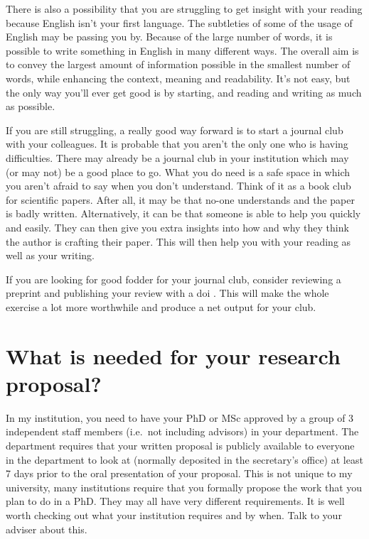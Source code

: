 \documentclass[
]{krantz}
\begin{document}
There is also a possibility that you are struggling to get insight with your reading because English isn't your first language. The subtleties of some of the usage of English may be passing you by. Because of the large number of words, it is possible to write something in English in many different ways. The overall aim is to convey the largest amount of information possible in the smallest number of words, while enhancing the context, meaning and readability. It's not easy, but the only way you'll ever get good is by starting, and reading and writing as much as possible.

If you are still struggling, a really good way forward is to start a journal club with your colleagues. It is probable that you aren't the only one who is having difficulties. There may already be a journal club in your institution which may (or may not) be a good place to go. What you do need is a safe space in which you aren't afraid to say when you don't understand. Think of it as a book club for scientific papers. After all, it may be that no-one understands and the paper is badly written. Alternatively, it can be that someone is able to help you quickly and easily. They can then give you extra insights into how and why they think the author is crafting their paper. This will then help you with your reading as well as your writing.

If you are looking for good fodder for your journal club, consider reviewing a preprint and publishing your review with a doi \citep{teixeiradasilva2017fortifying}. This will make the whole exercise a lot more worthwhile and produce a net output for your club.

\hypertarget{proposal}{%
\section{What is needed for your research proposal?}\label{proposal}}

In my institution, you need to have your PhD or MSc approved by a group of 3 independent staff members (i.e.~not including advisors) in your department. The department requires that your written proposal is publicly available to everyone in the department to look at (normally deposited in the secretary's office) at least 7 days prior to the oral presentation of your proposal. This is not unique to my university, many institutions require that you formally propose the work that you plan to do in a PhD. They may all have very different requirements. It is well worth checking out what your institution requires and by when. Talk to your adviser about this.
\end{document}
